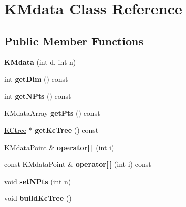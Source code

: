 \hypertarget{class_k_mdata}{
\section{KMdata Class Reference}
\label{class_k_mdata}
}
\subsection*{Public Member Functions}
\begin{DoxyCompactItemize}
\item 
\hypertarget{class_k_mdata_a68ec3711227e7511ea6bc5afff59fd4f}{
{\bfseries KMdata} (int d, int n)}
\label{class_k_mdata_a68ec3711227e7511ea6bc5afff59fd4f}

\item 
\hypertarget{class_k_mdata_a9830c1e3694b30369979b34984283ad9}{
int {\bfseries getDim} () const }
\label{class_k_mdata_a9830c1e3694b30369979b34984283ad9}

\item 
\hypertarget{class_k_mdata_ac23353438d1bdce80574c20556d980ea}{
int {\bfseries getNPts} () const }
\label{class_k_mdata_ac23353438d1bdce80574c20556d980ea}

\item 
\hypertarget{class_k_mdata_a945e684cb8079fbe99c448778f584c29}{
KMdataArray {\bfseries getPts} () const }
\label{class_k_mdata_a945e684cb8079fbe99c448778f584c29}

\item 
\hypertarget{class_k_mdata_a3d3c9932b99932b8cde5f7d2702a47a6}{
\hyperlink{class_k_ctree}{KCtree} $\ast$ {\bfseries getKcTree} () const }
\label{class_k_mdata_a3d3c9932b99932b8cde5f7d2702a47a6}

\item 
\hypertarget{class_k_mdata_a8305573717aecfd3ba8265895444fa59}{
KMdataPoint \& {\bfseries operator\mbox{[}$\,$\mbox{]}} (int i)}
\label{class_k_mdata_a8305573717aecfd3ba8265895444fa59}

\item 
\hypertarget{class_k_mdata_a49f9dd3177d170f54637fc45d8a5d2d8}{
const KMdataPoint \& {\bfseries operator\mbox{[}$\,$\mbox{]}} (int i) const }
\label{class_k_mdata_a49f9dd3177d170f54637fc45d8a5d2d8}

\item 
\hypertarget{class_k_mdata_a59a902b34429d61cfa691dea420efc83}{
void {\bfseries setNPts} (int n)}
\label{class_k_mdata_a59a902b34429d61cfa691dea420efc83}

\item 
\hypertarget{class_k_mdata_a9b97bf261617385e7d3718de30ad4ecb}{
void {\bfseries buildKcTree} ()}
\label{class_k_mdata_a9b97bf261617385e7d3718de30ad4ecb}


\end{DoxyCompactItemize}
